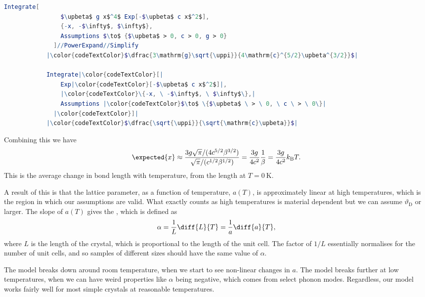 \documentclass[fleqn]{NotesClass}
\newcommand*{\boltzmann}{k_{\mathrm{B}}}
\newcommand*{\debye}{\mathrm{D}}
\begin{document}
    \begin{cde}{}{}
        \begin{lstlisting}[gobble=12, language=mathematica, mathescape=true,escapechar=|]
            Integrate[
                $\upbeta$ g x$^4$ Exp[-$\upbeta$ c x$^2$],
                {-x, -$\infty$, $\infty$},
                Assumptions $\to$ {$\upbeta$ > 0, c > 0, g > 0}
              ]//PowerExpand//Simplify
            |\color{codeTextColor}$\dfrac{3\mathrm{g}\sqrt{\uppi}}{4\mathrm{c}^{5/2}\upbeta^{3/2}}$|
            
            Integrate|\color{codeTextColor}[|
                Exp|\color{codeTextColor}[-$\upbeta$ c x$^2$]|,
                |\color{codeTextColor}\{-x, \ -$\infty$, \ $\infty$\},|
                Assumptions |\color{codeTextColor}$\to$ \{$\upbeta$ \ > \ 0, \ c \ > \ 0\}|
              |\color{codeTextColor}]|
            |\color{codeTextColor}$\dfrac{\sqrt{\uppi}}{\sqrt{\mathrm{c}\upbeta}}$|
        \end{lstlisting}
    \end{cde}
    
    Combining this we have
    \begin{equation}
        \expected{x} \approx \frac{3g\sqrt{\pi}/(4c^{5/2}\beta^{3/2})}{\sqrt{\pi}/(c^{1/2}\beta^{1/2})} = \frac{3g}{4c^2}\frac{1}{\beta} = \frac{3g}{4c^2}\boltzmann T.
    \end{equation}
    This is the average change in bond length with temperature, from the length at \(T = \qty{0}{\kelvin}\).
    
    A result of this is that the lattice parameter, as a function of temperature, \(a(T)\), is approximately linear at high temperatures, which is the region in which our assumptions are valid.
    What exactly counts as high temperatures is material dependent but we can assume \(\vartheta_{\debye}\) or larger.
    The slope of \(a(T)\) gives the , which is defined as
    \begin{equation}
        \alpha = \frac{1}{L} \diff{L}{T} = \frac{1}{a} \diff{a}{T},
    \end{equation}
    where \(L\) is the length of the crystal, which is proportional to the length of the unit cell.
    The factor of \(1/L\) essentially normalises for the number of unit cells, and so samples of different sizes should have the same value of \(\alpha\).
    
    The model breaks down around room temperature, when we start to see non-linear changes in \(a\).
    The model breaks further at low temperatures, when we can have weird properties like \(\alpha\) being negative, which comes from select phonon modes.
    Regardless, our model works fairly well for most simple crystals at reasonable temperatures.
    
\end{document}
